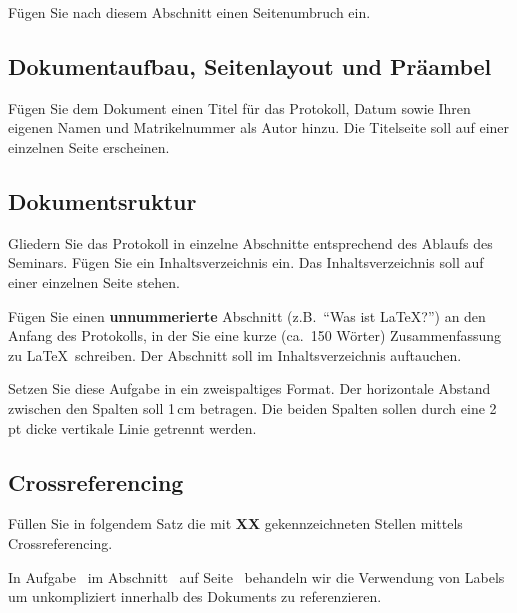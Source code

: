 \begin{aufgabe}
F\"ugen Sie nach diesem Abschnitt einen Seitenumbruch ein.	
\end{aufgabe}

\pagebreak %


\subsection{Dokumentaufbau, Seitenlayout und Präambel}
\begin{aufgabe}
F\"ugen Sie dem Dokument einen Titel f\"ur das Protokoll, Datum sowie Ihren
eigenen Namen und Matrikelnummer als Autor hinzu. Die Titelseite soll auf
einer einzelnen Seite erscheinen.
\end{aufgabe}	

\subsection{Dokumentsruktur}
\begin{aufgabe}
Gliedern Sie das Protokoll in einzelne Abschnitte entsprechend des Ablaufs
des Seminars. F\"ugen Sie ein Inhaltsverzeichnis ein. Das Inhaltsverzeichnis
soll auf einer einzelnen Seite stehen.
\end{aufgabe}

\begin{aufgabe}
F\"ugen Sie einen \textbf{unnummerierte} Abschnitt (z.B.\ ``Was ist
\LaTeX?'') an den Anfang des Protokolls, in der Sie eine kurze (ca.\ 150
W\"orter) Zusammenfassung zu \LaTeX\ schreiben. Der Abschnitt soll im
Inhaltsverzeichnis auftauchen.
\end{aufgabe}

\begin{multicols}{2}
\begin{aufgabe}
Setzen Sie diese Aufgabe in ein zweispaltiges Format. Der horizontale Abstand zwischen den Spalten soll 1\,cm betragen. Die beiden Spalten sollen durch eine 2\,pt dicke vertikale Linie getrennt werden. 		
\end{aufgabe}
\end{multicols}


\subsection{Crossreferencing}
\label{subs:Crossreferencing}
\begin{aufgabe}
\label{aufg:9}
F\"ullen Sie in folgendem Satz die mit \textbf{XX} gekennzeichneten Stellen
mittels Crossreferencing.
\end{aufgabe}
In Aufgabe~ im Abschnitt~ auf Seite~\textbf{\pageref{subs:Crossreferencing}}
behandeln wir die Verwendung von Labels um unkompliziert innerhalb des
Dokuments zu referenzieren.
